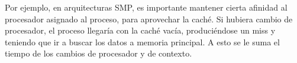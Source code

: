 Por ejemplo, en arquitecturas SMP, es importante mantener cierta afinidad al procesador asignado al proceso, para aprovechar la caché. Si hubiera cambio de procesador, el proceso llegaría con la caché vacía, produciéndose un miss y teniendo que ir a buscar los datos a memoria principal. A esto se le suma el tiempo de los cambios de procesador y de contexto.





